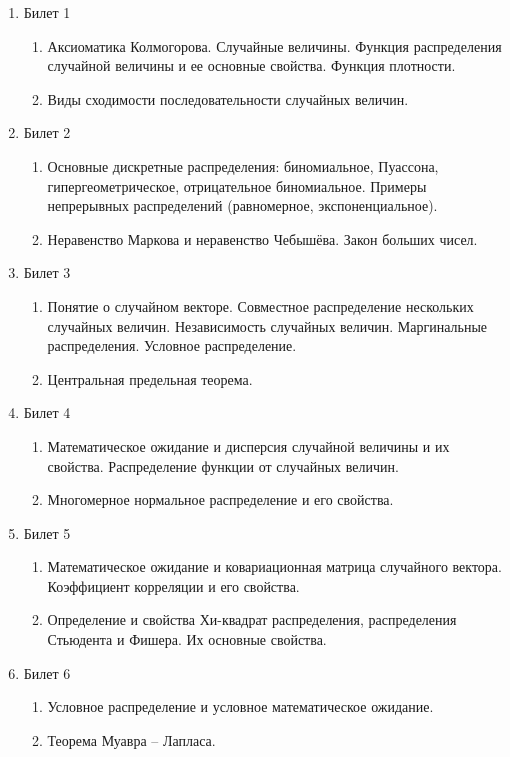 \documentclass[12pt, a4paper]{article}\usepackage[]{graphicx}\usepackage[]{color}
\begin{document}
				\begin{enumerate}


					\item Билет 1
					\begin{enumerate}
						\item Аксиоматика Колмогорова. Случайные величины. Функция
						распределения случайной величины и ее основные свойства. Функция
						плотности.
						\item Виды сходимости последовательности случайных величин.
					\end{enumerate}

					\item Билет 2
					\begin{enumerate}
						\item Основные дискретные распределения: биномиальное, Пуассона,
						гипергеометрическое, отрицательное биномиальное. Примеры
						непрерывных распределений (равномерное, экспоненциальное).
						\item Неравенство Маркова и неравенство Чебышёва. Закон больших чисел.
					\end{enumerate}


					\item Билет 3
					\begin{enumerate}
						\item Понятие о случайном векторе. Совместное распределение нескольких
						случайных величин. Независимость случайных величин. Маргинальные
						распределения. Условное распределение.
						\item Центральная предельная теорема.
					\end{enumerate}


					\item Билет 4
					\begin{enumerate}
						\item Математическое ожидание и дисперсия случайной величины и их
						свойства. Распределение функции от случайных величин.
						\item Многомерное нормальное распределение и его свойства.
					\end{enumerate}

					\item Билет 5
					\begin{enumerate}
						\item Математическое ожидание и ковариационная матрица случайного
						вектора. Коэффициент корреляции и его свойства.
						\item Определение и свойства Хи-квадрат распределения, распределения Стьюдента и Фишера. Их основные свойства.
					\end{enumerate}

					\item Билет 6
					\begin{enumerate}
						\item Условное распределение и условное математическое ожидание.
						\item Теорема Муавра – Лапласа.
					\end{enumerate}

				\end{enumerate}
\end{document}
